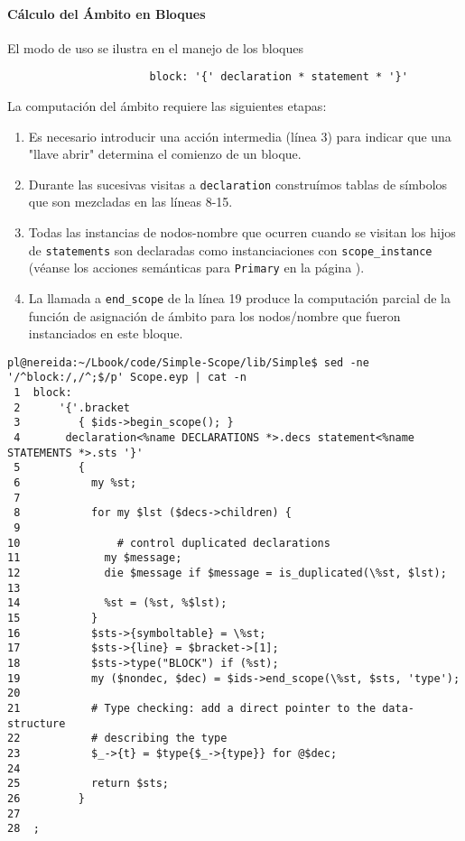 \paragraph{Cálculo del Ámbito en Bloques}

El modo de uso se ilustra en el manejo de los bloques
\begin{verbatim}
                      block: '{' declaration * statement * '}'
\end{verbatim}

La computación del ámbito requiere las siguientes etapas:
\begin{enumerate}
\item
Es necesario introducir una acción intermedia (línea 3) para indicar
que una "llave abrir" determina el comienzo de un bloque. 
\item

Durante las sucesivas visitas a \verb|declaration| construímos
tablas de símbolos que son mezcladas en las líneas 8-15.
\item

Todas
las instancias de nodos-nombre que ocurren cuando se 
visitan los hijos de \verb|statements| son declaradas como
instanciaciones con \verb|scope_instance| (véanse los acciones
semánticas para \verb|Primary| en la página \pageref{code:primary}).
\item

La llamada a \verb|end_scope| de la línea 19
produce la computación parcial de la función de asignación de ámbito
para los nodos/nombre que fueron instanciados en este bloque.
\end{enumerate}

\begin{verbatim}
pl@nereida:~/Lbook/code/Simple-Scope/lib/Simple$ sed -ne '/^block:/,/^;$/p' Scope.eyp | cat -n
 1  block:
 2      '{'.bracket
 3         { $ids->begin_scope(); }
 4       declaration<%name DECLARATIONS *>.decs statement<%name STATEMENTS *>.sts '}'
 5         {
 6           my %st;
 7
 8           for my $lst ($decs->children) {
 9
10               # control duplicated declarations
11             my $message;
12             die $message if $message = is_duplicated(\%st, $lst);
13
14             %st = (%st, %$lst);
15           }
16           $sts->{symboltable} = \%st;
17           $sts->{line} = $bracket->[1];
18           $sts->type("BLOCK") if (%st);
19           my ($nondec, $dec) = $ids->end_scope(\%st, $sts, 'type');
20
21           # Type checking: add a direct pointer to the data-structure
22           # describing the type
23           $_->{t} = $type{$_->{type}} for @$dec;
24
25           return $sts;
26         }
27
28  ;
\end{verbatim}

